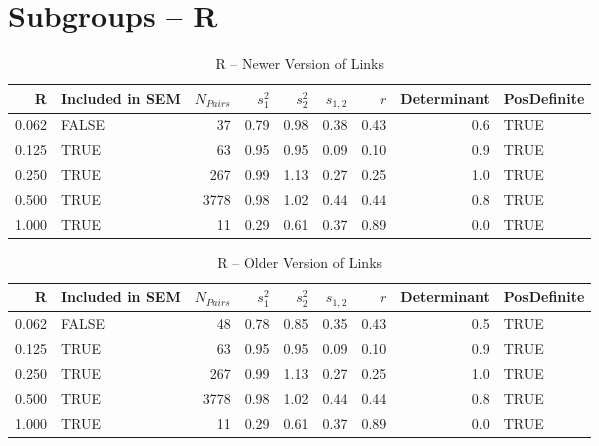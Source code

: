 \documentclass{article}\usepackage[]{graphicx}\usepackage[]{color}
\begin{document}
\section{Subgroups --  R }%
\begin{table}[ht]
\centering
\begin{tabular}{rlrrrrrrl}
  \hline
R & Included in SEM & $N_{Pairs}$ & $s_1^2$ & $s_2^2$ & $s_{1,2}$ & $r$ & Determinant & PosDefinite \\ 
  \hline
0.062 & FALSE & 37 & 0.79 & 0.98 & 0.38 & 0.43 & 0.6 & TRUE \\ 
  0.125 & TRUE & 63 & 0.95 & 0.95 & 0.09 & 0.10 & 0.9 & TRUE \\ 
  0.250 & TRUE & 267 & 0.99 & 1.13 & 0.27 & 0.25 & 1.0 & TRUE \\ 
  0.500 & TRUE & 3778 & 0.98 & 1.02 & 0.44 & 0.44 & 0.8 & TRUE \\ 
  1.000 & TRUE & 11 & 0.29 & 0.61 & 0.37 & 0.89 & 0.0 & TRUE \\ 
   \hline
\end{tabular}
\caption{R -- Newer Version of Links} 
\end{table}
\begin{table}[ht]
\centering
\begin{tabular}{rlrrrrrrl}
  \hline
R & Included in SEM & $N_{Pairs}$ & $s_1^2$ & $s_2^2$ & $s_{1,2}$ & $r$ & Determinant & PosDefinite \\ 
  \hline
0.062 & FALSE & 48 & 0.78 & 0.85 & 0.35 & 0.43 & 0.5 & TRUE \\ 
  0.125 & TRUE & 63 & 0.95 & 0.95 & 0.09 & 0.10 & 0.9 & TRUE \\ 
  0.250 & TRUE & 267 & 0.99 & 1.13 & 0.27 & 0.25 & 1.0 & TRUE \\ 
  0.500 & TRUE & 3778 & 0.98 & 1.02 & 0.44 & 0.44 & 0.8 & TRUE \\ 
  1.000 & TRUE & 11 & 0.29 & 0.61 & 0.37 & 0.89 & 0.0 & TRUE \\ 
   \hline
\end{tabular}
\caption{R -- Older Version of Links} 
\end{table}
\newpage 
\end{document}
